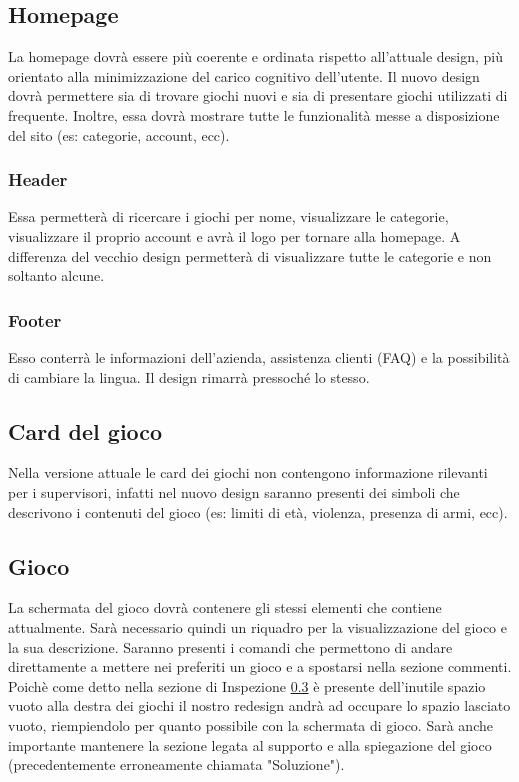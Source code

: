 \documentclass[../Report.tex]{subfiles}
\begin{document}
    \subsection{Homepage}
    La homepage dovrà essere più coerente e ordinata rispetto all'attuale design, più orientato alla minimizzazione del carico cognitivo dell'utente. Il nuovo design dovrà permettere sia di trovare giochi nuovi e sia di presentare giochi utilizzati di frequente. Inoltre, essa dovrà mostrare tutte le funzionalità messe a disposizione del sito (es: categorie, account, ecc).

    \subsubsection{Header}
    Essa permetterà di ricercare i giochi per nome, visualizzare le categorie, visualizzare il proprio account e avrà il logo per tornare alla homepage. A differenza del vecchio design permetterà di visualizzare tutte le categorie e non soltanto alcune. 

    \subsubsection{Footer}
    Esso conterrà le informazioni dell'azienda, assistenza clienti (FAQ) e la possibilità di cambiare la lingua. Il design rimarrà pressoché lo stesso.
    
    \subsection{Card del gioco}
    Nella versione attuale le card dei giochi non contengono informazione rilevanti per i supervisori, infatti nel nuovo design saranno presenti dei simboli che descrivono i contenuti del gioco (es: limiti di età, violenza, presenza di armi, ecc).

    \subsection{Gioco}
    La schermata del gioco dovrà contenere gli stessi elementi che contiene attualmente. Sarà necessario quindi un riquadro per la visualizzazione del gioco e la sua descrizione. Saranno presenti i comandi che permettono di andare direttamente a mettere nei preferiti un gioco e a spostarsi nella sezione commenti. Poichè come detto nella sezione di Inspezione \ref{} è presente dell'inutile spazio vuoto alla destra dei giochi il nostro redesign andrà ad occupare lo spazio lasciato vuoto, riempiendolo per quanto possibile con la schermata di gioco. Sarà anche importante mantenere la sezione legata al supporto e alla spiegazione del gioco (precedentemente erroneamente chiamata "Soluzione").
\end{document}

